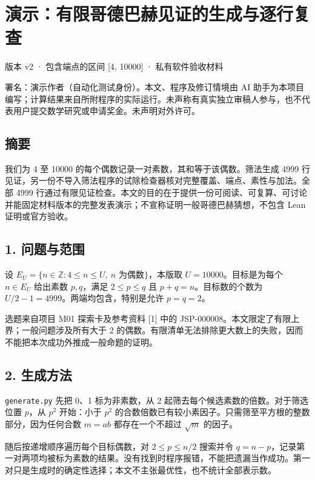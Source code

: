 \documentclass[
  11pt,
  fontset=fandol]{ctexart}
\author{}
\date{}
\begin{document}
\section{演示：有限哥德巴赫见证的生成与逐行复查}\label{ux6f14ux793aux6709ux9650ux54e5ux5fb7ux5df4ux8d6bux89c1ux8bc1ux7684ux751fux6210ux4e0eux9010ux884cux590dux67e5}

版本 v2 · 包含端点的区间 {[}4, 10000{]} · 私有软件验收材料

署名：演示作者（自动化测试身份）。本文、程序及修订情境由 AI
助手为本项目编写；计算结果来自所附程序的实际运行。未声称有真实独立审稿人参与，也不代表用户提交数学研究或申请奖金。未声明对外许可。

\subsection{摘要}\label{ux6458ux8981}

我们为 4 至 10000 的每个偶数记录一对素数，其和等于该偶数。筛法生成 4999
行见证，另一份不导入筛法程序的试除检查器核对完整覆盖、端点、素性与加法。全部
4999
行通过有限见证检查。本文的目的在于提供一份可阅读、可复算、可讨论并能固定材料版本的完整发表演示；不宣称证明一般哥德巴赫猜想，不包含
Lean 证明或官方验收。

\subsection{1. 问题与范围}\label{ux95eeux9898ux4e0eux8303ux56f4}

设 \(E_U=\{n\in\mathbb{Z}:4\leq n\leq U,\ n\text{ 为偶数}\}\)，本版取
\(U=10000\)。目标是为每个 \(n\in E_U\) 给出素数 \(p,q\)，满足
\(2\leq p\leq q\) 且 \(p+q=n\)。目标数的个数为
\(U/2-1=4999\)。两端均包含，特别是允许 \(p=q=2\)。

选题来自项目 M01 探索卡及参考资料 {[}1{]} 中的
JSP-000008。本文限定了有限上界；一般问题涉及所有大于 2
的偶数。有限清单无法排除更大数上的失败，因而不能把本次成功外推成一般命题的证明。

\subsection{2. 生成方法}\label{ux751fux6210ux65b9ux6cd5}

\texttt{generate.py} 先把 0、1 标为非素数，从 2
起筛去每个候选素数的倍数。对于筛选位置 \(p\)，从 \(p^2\) 开始：小于
\(p^2\) 的合数倍数已有较小素因子。只需筛至平方根的整数部分，因为任何合数
\(m=ab\) 都存在一个不超过 \(\sqrt{m}\) 的因子。

随后按递增顺序遍历每个目标偶数，对 \(2\leq p\leq n/2\) 搜索并令
\(q=n-p\)，记录第一对两项均被标为素数的结果。没有找到时程序报错，不能把遗漏当作成功。第一对只是生成时的确定性选择；本文不主张最优性，也不统计全部表示数。
\end{document}
